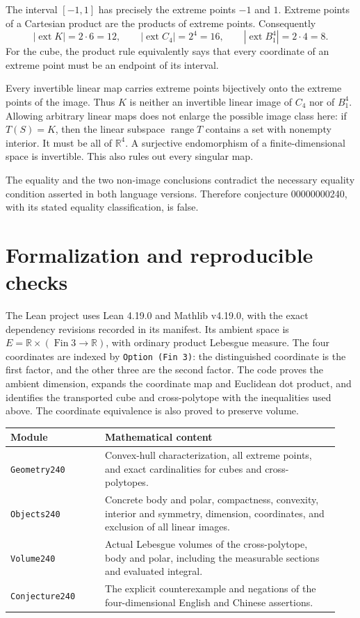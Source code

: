\documentclass[11pt]{article}
\newcommand{\R}{\mathbb R}
\newcommand{\ext}{\operatorname{ext}}
\begin{document}
The interval $[-1,1]$ has precisely the extreme points $-1$ and $1$.
Extreme points of a Cartesian product are the products of extreme points.
Consequently
\[
 |\ext K|=2\cdot6=12,\qquad
 |\ext C_4|=2^4=16,\qquad
 |\ext B_1^4|=2\cdot4=8.
\]
For the cube, the product rule equivalently says that every coordinate of
an extreme point must be an endpoint of its interval.

Every invertible linear map carries extreme points bijectively onto the
extreme points of the image. Thus $K$ is neither an invertible linear
image of $C_4$ nor of $B_1^4$. Allowing arbitrary linear maps does not
enlarge the possible image class here: if $T(S)=K$, then the linear
subspace $\operatorname{range}T$ contains a set with nonempty interior.
It must be all of $\R^4$. A surjective endomorphism of a finite-dimensional
space is invertible. This also rules out every singular map.

The equality and the two non-image conclusions contradict the necessary
equality condition asserted in both language versions. Therefore
conjecture 00000000240, with its stated equality classification, is false.

\section{Formalization and reproducible checks}
The Lean project uses Lean 4.19.0 and Mathlib v4.19.0, with the exact
dependency revisions recorded in its manifest. Its ambient space is
$E=\R\times(\operatorname{Fin}3\to\R)$, with ordinary product
Lebesgue measure. The four coordinates are indexed by
\texttt{Option (Fin 3)}: the distinguished coordinate is the first factor,
and the other three are the second factor. The code proves the ambient
dimension, expands the coordinate map and Euclidean dot product, and
identifies the transported cube and cross-polytope with the inequalities
used above. The coordinate equivalence is also proved to preserve volume.

\begin{center}
\begin{tabular}{@{}p{0.27\linewidth}p{0.67\linewidth}@{}}
\toprule
Module & Mathematical content\\
\midrule
\texttt{Geometry240} & Convex-hull characterization, all extreme points,
and exact cardinalities for cubes and cross-polytopes.\\
\texttt{Objects240} & Concrete body and polar, compactness, convexity,
interior and symmetry, dimension, coordinates, and exclusion of all
linear images.\\
\texttt{Volume240} & Actual Lebesgue volumes of the cross-polytope,
body and polar, including the measurable sections and evaluated integral.\\
\texttt{Conjecture240} & The explicit counterexample and negations of the
four-dimensional English and Chinese assertions.\\
\bottomrule
\end{tabular}
\end{center}
\end{document}
